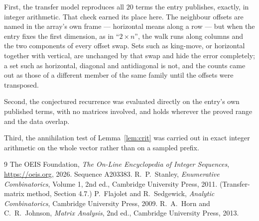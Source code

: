 \documentclass[11pt,a4paper]{article}
\theoremstyle{plain}
\theoremstyle{definition}
\begin{document}
First, the transfer model reproduces all $20$ terms the entry publishes, exactly, in
integer arithmetic. That check earned its place here. The neighbour offsets are named in the
array's own frame --- horizontal means along a row --- but when the entry fixes the first
dimension, as in ``$2\times n$'', the walk runs along columns and the two components of every
offset swap. Sets such as king-move, or horizontal together with vertical, are unchanged by
that swap and hide the error completely; a set such as horizontal, diagonal and antidiagonal
is not, and the counts came out as those of a different member of the same family until the
offsets were transposed.

Second, the conjectured recurrence was evaluated directly on the entry's own published terms,
with no matrices involved, and holds wherever the proved range and the data overlap.

Third, the annihilation test of Lemma~\ref{lem:crit} was carried out in exact integer
arithmetic on the whole vector rather than on a sampled prefix.

\begin{thebibliography}{9}
 The OEIS Foundation, \emph{The On-Line Encyclopedia of Integer
Sequences}, \url{https://oeis.org}, 2026. Sequence A203383.
 R.~P.~Stanley, \emph{Enumerative Combinatorics}, Volume 1, 2nd ed.,
Cambridge University Press, 2011. (Transfer-matrix method, Section 4.7.)
 P.~Flajolet and R.~Sedgewick, \emph{Analytic Combinatorics}, Cambridge
University Press, 2009.
 R.~A.~Horn and C.~R.~Johnson, \emph{Matrix Analysis}, 2nd ed., Cambridge
University Press, 2013.
\end{thebibliography}
\end{document}
